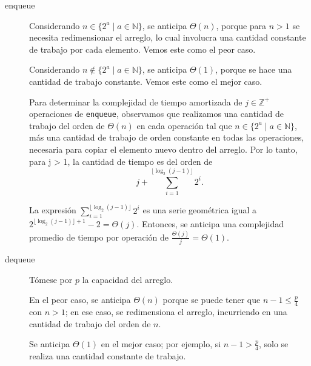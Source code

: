 \begin{description}
	\item[enqueue]{
		Considerando $n \in \{ 2^{a} \mid{} a \in \mathbb{N} \}$, se anticipa $\Theta{} (n)$, porque para $n > 1$ se necesita redimensionar el arreglo, lo cual involucra una cantidad constante de trabajo por cada elemento. Vemos este como el peor caso.

		Considerando $n \notin \{ 2^{a} \mid a \in \mathbb{N}\}$, se anticipa $\Theta{} (1)$, porque se hace una cantidad de trabajo constante. Vemos este como el mejor caso.

		Para determinar la complejidad de tiempo amortizada de $j \in \mathbb{Z}^{+}$ operaciones de \texttt{enqueue}, observamos que realizamos una cantidad de trabajo del orden de $\Theta{}(n)$ en cada operación tal que $n \in \{2^a \mid a \in \mathbb{N}\}$, más una cantidad de trabajo de orden constante en todas las operaciones, necesaria para copiar el elemento nuevo dentro del arreglo. Por lo tanto, para j > 1, la cantidad de tiempo es del orden de
		$$
			j + \sum_{i = 1}^{\lfloor{}\log_{2}(j - 1)\rfloor{}} 2^{i} \text{.}
		$$

		La expresión $\sum_{i = 1}^{\lfloor{}\log_{2}(j - 1)\rfloor{}} 2^{i}$ es una serie geométrica igual a $2^{\lfloor{}\log_{2}(j - 1)\rfloor{} + 1} - 2 = \Theta{}(j)$. Entonces, se anticipa una complejidad promedio de tiempo por operación de $\frac{\Theta{}(j)}{j} = \Theta{}(1)$.
	}
	\item[dequeue]{
		Tómese por $p$ la capacidad del arreglo.

		En el peor caso, se anticipa $\Theta{}(n)$ porque se puede tener que $n - 1 \le \frac{p}{4}$ con $n > 1$; en ese caso, se redimensiona el arreglo, incurriendo en una cantidad de trabajo del orden de $n$.

		Se anticipa $\Theta{}(1)$ en el mejor caso; por ejemplo, si $n - 1 > \frac{p}{4}$, solo se realiza una cantidad constante de trabajo.

}
\end{description}
